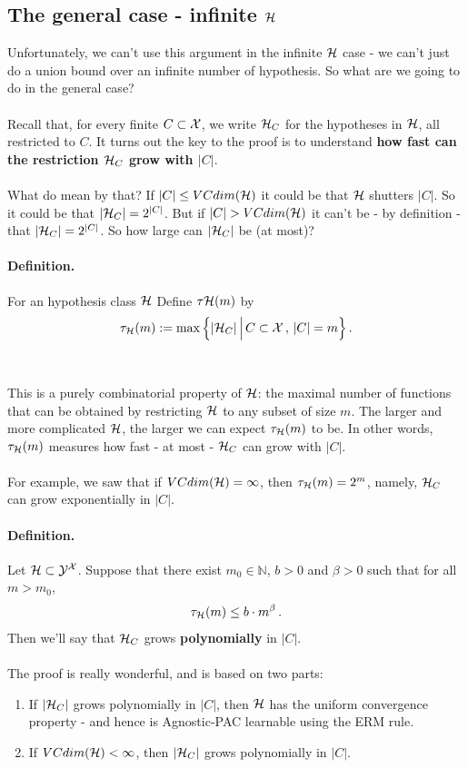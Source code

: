 \subsection{The general case - infinite $\mathcal{H}$}
Unfortunately, we can't use this argument in the infinite $\mathcal{H}$ case - we can't
just do a union bound over an infinite number of hypothesis.
So what are we going to do in the general case? 
\\~\\
Recall that, for every finite $C\subset \mathcal{X}$, we write $\mathcal{H}_C$ for the
hypotheses in $\mathcal{H}$, all restricted to $C$. 
It turns out the key to the proof is to understand {\bf how fast can the
restriction $\mathcal{H}_C$ grow with $|C|$}. 
\\~\\
What do mean by that? If 
$|C|\leq VCdim(\mathcal{H})$ it could be that $\mathcal{H}$ shutters $|C|$. So it could be that
$|\mathcal{H}_C|=2^{|C|}$. But if $|C| >  VCdim(\mathcal{H})$ it can't be - by definition - that 
$|\mathcal{H}_C|=2^{|C|}$. So how large can $|\mathcal{H}_C|$ be (at most)?
%
\paragraph{Definition.}
    For an hypothesis class $\mathcal{H}$ Define $\tau\mathcal{H}(m)$ by
    \[
        \tau_{\mathcal{H}}(m) := \max\left\{ |\mathcal{H}_C| \, \Big|\, C\subset \mathcal{X} \,,\, |C|=m
        \right\}.
    \]
\\~\\
This is a purely combinatorial property of $\mathcal{H}$: the maximal number of functions that can
be obtained by restricting $\mathcal{H}$ to any subset of size $m$. The larger and more
complicated $\mathcal{H}$, the larger we can expect $\tau_{\mathcal{H}}(m)$ to be. 
In other words, $\tau_{\mathcal{H}}(m)$  measures how fast - at
most -
$\mathcal{H}_C$ can grow with $|C|$.
\\~\\
For example, we saw that if $VCdim(\mathcal{H})=\infty$, then  $\tau_{\mathcal{H}}(m)=2^m$,
namely, $\mathcal{H}_C$ can grow
exponentially in $|C|$.

%
\paragraph{Definition.}
  Let $\mathcal{H}\subset\mathcal{Y}^{\mathcal{X}}$. 
  Suppose that there exist $m_0\in\mathbb{N}$, $b>0$ and $\beta>0$ such that for
  all $m>m_0$,
  \[
    \tau_{\mathcal{H}}(m) \leq b\cdot m^\beta\,.
  \]
  Then we'll say that $\mathcal{H}_C$ grows {\bf polynomially} in
  $|C|$.
\\~\\
%
The proof is really wonderful, and is based on two parts:
\begin{enumerate}
  \item  If 
    $|\mathcal{H}_C|$ grows polynomially in $|C|$, then
 $\mathcal{H}$ has the uniform convergence property - and hence
 is Agnostic-PAC learnable using the ERM rule.
 \item If $VCdim(\mathcal{H})<\infty$, then
  $|\mathcal{H}_C|$ grows polynomially in $|C|$.
\end{enumerate}


